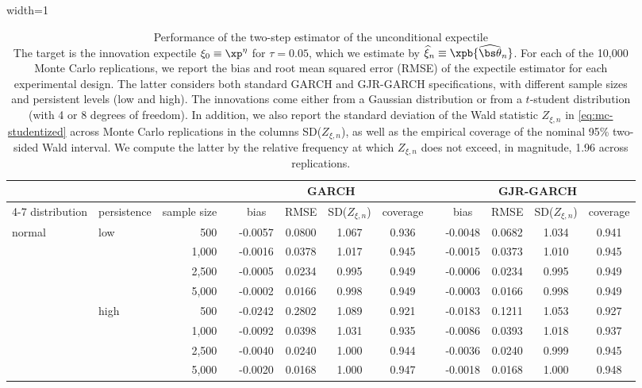 \begin{table}[t]
\caption{Performance of the two-step estimator of the unconditional expectile\\ {\footnotesize The target is the innovation expectile $\xi_0\equiv\xp^\eta$ for $\tau=0.05$, which we estimate by $\widehat\xi_n\equiv\xpb{\widehat{\bs\theta}_n}$. For each of the 10,000 Monte Carlo replications, we report the bias and root mean squared error (RMSE) of the expectile estimator for each experimental design. The latter considers both standard GARCH and GJR-GARCH specifications, with different sample sizes and persistent levels (low and high). The innovations come either from a Gaussian distribution or from a $t$-student distribution (with 4 or 8 degrees of freedom). In addition, we also report the standard deviation of the Wald statistic $Z_{\xi,n}$ in \eqref{eq:mc-studentized} across Monte Carlo replications in the columns SD($Z_{\xi,n}$), as well as the empirical coverage of the nominal 95\% two-sided Wald interval. We compute the latter by the relative frequency at which $Z_{\xi,n}$ does not exceed, in magnitude, 1.96 across replications.}}
\label{tab:mc-xi-wald-portrait}
\begin{adjustbox}{width=1\textwidth}
\renewcommand{\arraystretch}{1.25}
\begin{tabular}{llr*{9}{c}}
\toprule
&&&\multicolumn{4}{c}{GARCH}&&\multicolumn{4}{c}{GJR-GARCH}\\
\cline{4-7}\cline{9-12}
distribution & persistence & sample size~~ & bias & RMSE & SD($Z_{\xi,n}$) & coverage && bias & RMSE & SD($Z_{\xi,n}$) & coverage\\
\midrule
normal & low & 500~~ & -0.0057 & 0.0800 & 1.067 & 0.936 && -0.0048 & 0.0682 & 1.034 & 0.941\\
 &  & 1,000~~ & -0.0016 & 0.0378 & 1.017 & 0.945 && -0.0015 & 0.0373 & 1.010 & 0.945\\
 &  & 2,500~~ & -0.0005 & 0.0234 & 0.995 & 0.949 && -0.0006 & 0.0234 & 0.995 & 0.949\\
 &  & 5,000~~ & -0.0002 & 0.0166 & 0.998 & 0.949 && -0.0003 & 0.0166 & 0.998 & 0.949\\
\addlinespace[1pt]
 & high & 500~~ & -0.0242 & 0.2802 & 1.089 & 0.921 && -0.0183 & 0.1211 & 1.053 & 0.927\\
 &  & 1,000~~ & -0.0092 & 0.0398 & 1.031 & 0.935 && -0.0086 & 0.0393 & 1.018 & 0.937\\
 &  & 2,500~~ & -0.0040 & 0.0240 & 1.000 & 0.944 && -0.0036 & 0.0240 & 0.999 & 0.945\\
 &  & 5,000~~ & -0.0020 & 0.0168 & 1.000 & 0.947 && -0.0018 & 0.0168 & 1.000 & 0.948\\

\end{tabular}
\end{adjustbox}
\end{table}
